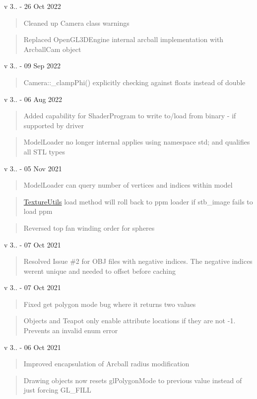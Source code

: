 v 3.. -\/ 26 Oct 2022 \begin{quote}
Cleaned up Camera class warnings \end{quote}
\begin{quote}
Replaced Open\+GL3\+DEngine internal arcball implementation with Arcball\+Cam object \end{quote}
v 3.. -\/ 09 Sep 2022 \begin{quote}
Camera\+::\+\_\+clamp\+Phi() explicitly checking against floats instead of double \end{quote}
v 3.. -\/ 06 Aug 2022 \begin{quote}
Added capability for Shader\+Program to write to/load from binary -\/ if supported by driver \end{quote}
\begin{quote}
Model\+Loader no longer internal applies using namespace std; and qualifies all STL types \end{quote}
v 3.. -\/ 05 Nov 2021 \begin{quote}
Model\+Loader can query number of vertices and indices within model \end{quote}
\begin{quote}
\mbox{\hyperlink{namespace_texture_utils}{Texture\+Utils}} load method will roll back to ppm loader if stb\+\_\+image fails to load ppm \end{quote}
\begin{quote}
Reversed top fan winding order for spheres \end{quote}
v 3.. -\/ 07 Oct 2021 \begin{quote}
Resolved Issue \#2 for OBJ files with negative indices. The negative indices weren\textquotesingle{}t unique and needed to offset before caching \end{quote}
v 3.. -\/ 07 Oct 2021 \begin{quote}
Fixed get polygon mode bug where it returns two values \end{quote}
\begin{quote}
Objects and Teapot only enable attribute locations if they are not -\/1. Prevents an invalid enum error \end{quote}
v 3.. -\/ 06 Oct 2021 \begin{quote}
Improved encapsulation of Arcball radius modification \end{quote}
\begin{quote}
Drawing objects now resets gl\+Polygon\+Mode to previous value instead of just forcing GL\+\_\+\+FILL \end{quote}
